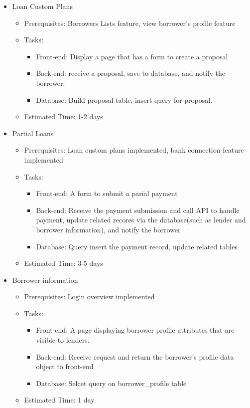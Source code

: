 \begin{itemize}
	\item Loan Custom Plans
	\begin{itemize}
		\item Prerequisites: Borrowers Lists feature, view borrower's profile feature
		\item Tasks:
		\begin{itemize}
			\item Front-end: Display a page that has a form to create a proposal
			\item Back-end: receive a proposal, save to database, and notify the borrower.
			\item Database: Build proposal table, insert query for proposal.
		\end{itemize}
		\item Estimated Time: 1-2 days
	\end{itemize}

	\item Partial Loans
	\begin{itemize}
		\item Prerequisites: Loan custom plans implemented, bank connection feature implemented
		\item Tasks:
		\begin{itemize}
			\item Front-end: A form to submit a parial payment
			\item Back-end: Receive the payment submission and call API to handle payment, update related recores via the database(such as lender and borrower information), and notify the borrower
			\item Database: Query insert the payment record, update related tables
		\end{itemize}
		\item Estimated Time: 3-5 days
	\end{itemize}

	\item Borrower information
	\begin{itemize}
		\item Prerequisites: Login overview implemented
		\item Tasks:
		\begin{itemize}
			\item Front-end: A page displaying borrower profile attributes that are visible to lenders.
			\item Back-end: Receive request and return the borrower's profile data object to front-end
			\item Database: Selcet query on borrower\_profile table
		\end{itemize}
		\item Estimated Time: 1 day
	\end{itemize}


\end{itemize}
